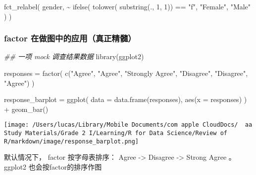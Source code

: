 \documentclass[
]{article}
\let\oldincludegraphics\includegraphics
\renewcommand{\includegraphics}[2][]{\begin{center}\oldincludegraphics[#1]{#2}\end{center}}
\newenvironment{Shaded}{}{}
\newcommand{\AttributeTok}[1]{\textcolor[rgb]{0.49,0.56,0.16}{#1}}
\newcommand{\DecValTok}[1]{\textcolor[rgb]{0.25,0.63,0.44}{#1}}
\newcommand{\DocumentationTok}[1]{\textcolor[rgb]{0.73,0.13,0.13}{\textit{#1}}}
\newcommand{\FunctionTok}[1]{\textcolor[rgb]{0.02,0.16,0.49}{#1}}
\newcommand{\NormalTok}[1]{#1}
\newcommand{\OtherTok}[1]{\textcolor[rgb]{0.00,0.44,0.13}{#1}}
\newcommand{\SpecialCharTok}[1]{\textcolor[rgb]{0.25,0.44,0.63}{#1}}
\newcommand{\StringTok}[1]{\textcolor[rgb]{0.25,0.44,0.63}{#1}}
\begin{document}
\begin{Shaded}
\begin{Highlighting}[]
\FunctionTok{fct\_relabel}\NormalTok{(}
\NormalTok{  gender,}
  \SpecialCharTok{\textasciitilde{}} \FunctionTok{ifelse}\NormalTok{(}
    \FunctionTok{tolower}\NormalTok{(}
      \FunctionTok{substring}\NormalTok{(., }\DecValTok{1}\NormalTok{, }\DecValTok{1}\NormalTok{)) }\SpecialCharTok{==} \StringTok{"f"}\NormalTok{,}
    \StringTok{"Female"}\NormalTok{,}
    \StringTok{"Male"}
\NormalTok{  )}
\NormalTok{)}
\end{Highlighting}
\end{Shaded}

\hypertarget{factor-ux5728ux505aux56feux4e2dux7684ux5e94ux7528ux771fux6b63ux7cbeux9ad3uxff09}{%
\subsubsection{\texorpdfstring{factor
在做图中的应用（\textbf{真正精髓}）}{factor 在做图中的应用（真正精髓）}}\label{factor-ux5728ux505aux56feux4e2dux7684ux5e94ux7528ux771fux6b63ux7cbeux9ad3uxff09}}

\begin{Shaded}
\begin{Highlighting}[]
\DocumentationTok{\#\# 一项 mock 调查结果数据}
\FunctionTok{library}\NormalTok{(ggplot2)}

\NormalTok{responses }\OtherTok{=}
  \FunctionTok{factor}\NormalTok{(}
    \FunctionTok{c}\NormalTok{(}\StringTok{"Agree"}\NormalTok{, }\StringTok{"Agree"}\NormalTok{, }\StringTok{"Strongly Agree"}\NormalTok{, }\StringTok{"Disagree"}\NormalTok{, }\StringTok{"Disagree"}\NormalTok{, }\StringTok{"Agree"}\NormalTok{)}
\NormalTok{  )}

\NormalTok{response\_barplot }\OtherTok{=}
  \FunctionTok{ggplot}\NormalTok{(}
    \AttributeTok{data =} \FunctionTok{data.frame}\NormalTok{(responses),}
    \FunctionTok{aes}\NormalTok{(}\AttributeTok{x =}\NormalTok{ responses)}
\NormalTok{  ) }\SpecialCharTok{+}
  \FunctionTok{geom\_bar}\NormalTok{()}
\end{Highlighting}
\end{Shaded}

\texttt{[image: /Users/lucas/Library/Mobile Documents/com~apple~CloudDocs/~~aa Study Materials/Grade 2 I/Learning/R for Data Science/Review of R/markdown/image/response\_barplot.png]}

默认情况下， factor 按字母表排序： Agree -\textgreater{} Disagree
-\textgreater{} Strong Agree 。ggplot2 也会按factor的排序作图
\end{document}
